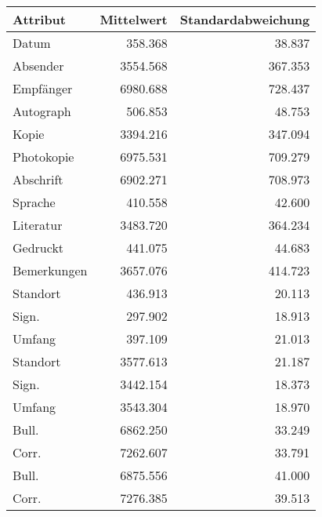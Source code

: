 \begin{tabular}{lrr}
\toprule
    Attribut &  Mittelwert &  Standardabweichung \\
\midrule
       Datum &     358.368 &              38.837 \\
    Absender &    3554.568 &             367.353 \\
   Empfänger &    6980.688 &             728.437 \\
   Autograph &     506.853 &              48.753 \\
       Kopie &    3394.216 &             347.094 \\
  Photokopie &    6975.531 &             709.279 \\
   Abschrift &    6902.271 &             708.973 \\
     Sprache &     410.558 &              42.600 \\
   Literatur &    3483.720 &             364.234 \\
    Gedruckt &     441.075 &              44.683 \\
 Bemerkungen &    3657.076 &             414.723 \\
    Standort &     436.913 &              20.113 \\
       Sign. &     297.902 &              18.913 \\
      Umfang &     397.109 &              21.013 \\
    Standort &    3577.613 &              21.187 \\
       Sign. &    3442.154 &              18.373 \\
      Umfang &    3543.304 &              18.970 \\
       Bull. &    6862.250 &              33.249 \\
       Corr. &    7262.607 &              33.791 \\
       Bull. &    6875.556 &              41.000 \\
       Corr. &    7276.385 &              39.513 \\
\bottomrule
\end{tabular}